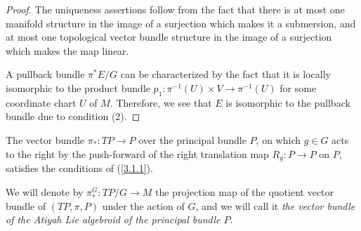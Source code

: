 \begin{proof}
The uniqueness assertions follow from the fact that there is at most one manifold structure in the image of a surjection which makes it a submersion, and at most one topological vector bundle structure in the image of a surjection which makes the map linear.

A pullback bundle $\pi^*E/G$ can be characterized  by the fact that it is locally isomorphic to the product bundle $p_1: \pi^{-1}(U) \times V \to \pi^{-1}(U)$ for some coordinate chart $U$ of $M$. Therefore, we see that $E$ is isomorphic to the pullback bundle due to condition (2).
\end{proof}

\begin{theorem}\label{theoTPGexists}
The vector bundle $\pi_*:TP \to P$ over the principal bundle $P$, on which $g \in G$ acts to the right by the push-forward of the right translation map $R_g: P \to P$ on $P$, satisfies the conditions of (\ref{3.1.1}).
\end{theorem}

We will denote by $\pi_*^G:TP/G \to M$ the projection map of the quotient vector bundle of $(TP, \pi, P)$ under the action of $G$, and we will call it \emph{the vector bundle of the Atiyah Lie algebroid of the principal bundle $P$}.

